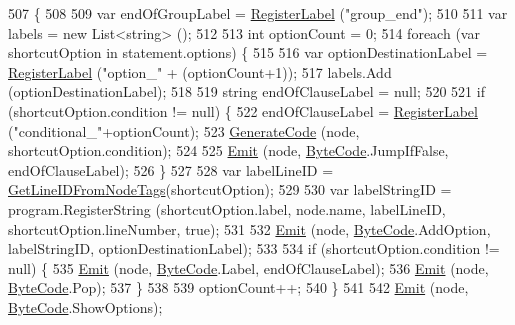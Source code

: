 \begin{DoxyCode}
507                                                                            \{
508 
509             var endOfGroupLabel = \hyperlink{a00032_a1bae0d8b701a59708641aa36ea971fa5}{RegisterLabel} (\textcolor{stringliteral}{"group\_end"});
510 
511             var labels = \textcolor{keyword}{new} List<string> ();
512 
513             \textcolor{keywordtype}{int} optionCount = 0;
514             \textcolor{keywordflow}{foreach} (var shortcutOption \textcolor{keywordflow}{in} statement.options) \{
515 
516                 var optionDestinationLabel = \hyperlink{a00032_a1bae0d8b701a59708641aa36ea971fa5}{RegisterLabel} (\textcolor{stringliteral}{"option\_"} + (optionCount+1));
517                 labels.Add (optionDestinationLabel);
518 
519                 \textcolor{keywordtype}{string} endOfClauseLabel = null;
520 
521                 \textcolor{keywordflow}{if} (shortcutOption.condition != null) \{
522                     endOfClauseLabel = \hyperlink{a00032_a1bae0d8b701a59708641aa36ea971fa5}{RegisterLabel} (\textcolor{stringliteral}{"conditional\_"}+optionCount);
523                     \hyperlink{a00032_a006f3becd521cc179ba3d3352f6f930b}{GenerateCode} (node, shortcutOption.condition);
524 
525                     \hyperlink{a00032_a774e8c143cdda0584fcfdda98626a83c}{Emit} (node, \hyperlink{a00029_ad5dfb6ee68ca7469623ad3e459f98894}{ByteCode}.JumpIfFalse, endOfClauseLabel);
526                 \}
527 
528                 var labelLineID = \hyperlink{a00032_a5117b9c2253de15d3fd3557c8b037235}{GetLineIDFromNodeTags}(shortcutOption);
529 
530                 var labelStringID = program.RegisterString (shortcutOption.label, node.name, labelLineID, 
      shortcutOption.lineNumber, \textcolor{keyword}{true});
531 
532                 \hyperlink{a00032_a774e8c143cdda0584fcfdda98626a83c}{Emit} (node, \hyperlink{a00029_ad5dfb6ee68ca7469623ad3e459f98894}{ByteCode}.AddOption, labelStringID, optionDestinationLabel);
533 
534                 \textcolor{keywordflow}{if} (shortcutOption.condition != null) \{
535                     \hyperlink{a00032_a774e8c143cdda0584fcfdda98626a83c}{Emit} (node, \hyperlink{a00029_ad5dfb6ee68ca7469623ad3e459f98894}{ByteCode}.Label, endOfClauseLabel);
536                     \hyperlink{a00032_a774e8c143cdda0584fcfdda98626a83c}{Emit} (node, \hyperlink{a00029_ad5dfb6ee68ca7469623ad3e459f98894}{ByteCode}.Pop);
537                 \}
538 
539                 optionCount++;
540             \}
541 
542             \hyperlink{a00032_a774e8c143cdda0584fcfdda98626a83c}{Emit} (node, \hyperlink{a00029_ad5dfb6ee68ca7469623ad3e459f98894}{ByteCode}.ShowOptions);

\end{DoxyCode}
